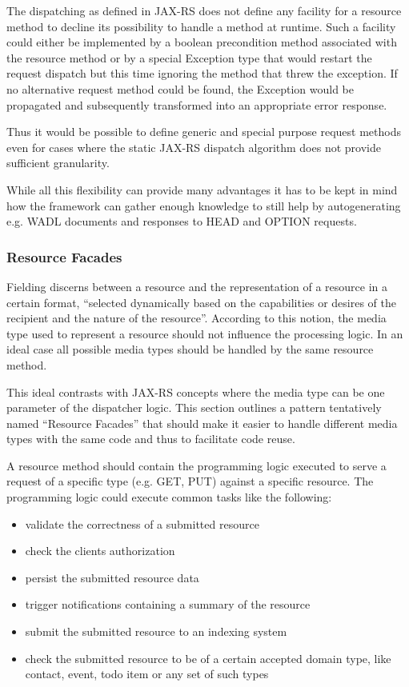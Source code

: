 \documentclass[12pt,a4paper]{scrartcl}		%
\begin{document}
The dispatching as defined in JAX-RS does not define any facility for a resource
method to decline its possibility to handle a method at runtime. Such a facility
could either be implemented by a boolean precondition method associated with the
resource method or by a special Exception type that would restart the request
dispatch but this time ignoring the method that threw the exception. If no
alternative request method could be found, the Exception would be propagated and
subsequently transformed into an appropriate error response.

Thus it would be possible to define generic and special purpose request methods
even for cases where the static JAX-RS dispatch algorithm does not provide
sufficient granularity.

While all this flexibility can provide many advantages it has to be kept in mind
how the framework can gather enough knowledge to still help by autogenerating
e.g. WADL documents and responses to HEAD and OPTION requests.

\subsubsection{Resource Facades}
\label{sec:resourcefacades}
Fielding discerns between a resource and the representation of a resource in a
certain format, ``selected dynamically based on the capabilities or desires of
the recipient and the nature of the resource''.\cite[p. 87]{Fielding2000}
According to this notion, the media type used to represent a resource should not
influence the processing logic. In an ideal case all possible media types should
be handled by the same resource method.

This ideal contrasts with JAX-RS concepts where the media type can be one
parameter of the dispatcher logic. This section outlines a pattern tentatively
named ``Resource Facades'' that should make it easier to handle different media
types with the same code and thus to facilitate code reuse.

A resource method should contain the programming logic executed to serve a
request of a specific type (e.g. GET, PUT) against a specific resource. The
programming logic could execute common tasks like the following:

\begin{itemize}
\item validate the correctness of a submitted resource
\item check the clients authorization
\item persist the submitted resource data
\item trigger notifications containing a summary of the resource
\item submit the submitted resource to an indexing system
\item check the submitted resource to be of a certain accepted domain type, like
  contact, event, todo item or any set of such types
\end{itemize}
\end{document}
